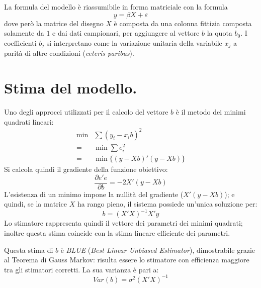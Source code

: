 \documentclass[11pt]{article}
\begin{document}
La formula del modello è riassumibile in forma matriciale con la formula
\begin{equation*}
  y = \beta X + \varepsilon
\end{equation*}
dove però la matrice del disegno $X$ è composta da una colonna fittizia composta solamente da $1$ e dai dati campionari, per aggiungere al vettore $b$ la quota $b_0$.
I coefficienti $b_j$ si interpretano come la variazione unitaria della variabile $x_j$ a parità di altre condizioni (\textit{ceteris paribus}).

\section{Stima del modello.}
Uno degli approcci utilizzati per il calcolo del vettore $b$ è il metodo dei minimi quadrati lineari:
\begin{align*}
  \min & \sum{(y_i - x_i b)^2} \\
  =& \min \sum{e_i^2} \\
  =& \min \{ (y -X b)'(y - X b) \}
\end{align*}
Si calcola quindi il gradiente della funzione obiettivo:
\begin{equation*}
  \frac{\partial{e'e}}{\partial{b}} = -2 X'(y - X b)
\end{equation*}
L'esistenza di un minimo impone la nullità del gradiente ($X'(y - X b)$); e quindi, se la matrice $X$ ha rango pieno, il sistema possiede un'unica soluzione per:
\begin{equation*}
  b = (X'X)^{-1}X'y
\end{equation*}
Lo stimatore rappresenta quindi il vettore dei parametri dei minimi quadrati; inoltre questa stima coincide con la stima lineare efficiente dei parametri.

Questa stima di $b$ è \textit{BLUE} (\textit{Best Linear Unbiased Estimator}), dimostrabile grazie al Teorema di Gauss Markov: risulta essere lo stimatore con efficienza maggiore tra gli stimatori corretti.
La sua varianza è pari a:
\begin{equation*}
  Var(b) = \sigma^2(X'X)^{-1}
\end{equation*}
\end{document}
